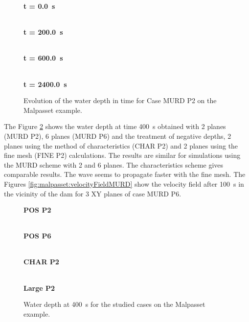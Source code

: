 \begin{figure}[H]
  \centering
  \textbf{t = 0.0~s}\par\medskip
  \\
  \textbf{t = 200.0~s}\par\medskip
  \\
  \textbf{t = 600.0~s}\par\medskip
  \\
  \textbf{t = 2400.0~s}\par\medskip
  \caption{Evolution of the water depth in time for Case MURD P2 on the Malpasset example.}\label{fig:malpasset:WD_MURD_P2}
\end{figure}
The Figure \ref{fig:malpasset:WD_all} shows the water depth at time 400~s obtained with 2
planes (MURD P2), 6 planes (MURD P6) and the treatment of negative depths,
2 planes using the method of characteristics (CHAR P2) and 2 planes using the fine mesh
(FINE P2) calculations. The results are similar for simulations using the MURD scheme with 2 and
6 planes. The characteristics scheme gives comparable results.
The wave seems to propagate faster with the fine mesh.
The Figures \ref{fig:malpasset:velocityFieldMURD} show the velocity field after 100~s in the vicinity of the dam for 3 XY planes of case MURD P6.
\begin{figure}[H]
  \centering
  \textbf{POS P2}\par\medskip
  \\
  \textbf{POS P6}\par\medskip
  \\
  \textbf{CHAR P2}\par\medskip
  \\
  \textbf{Large P2}\par\medskip
  \caption{Water depth at 400~s for the studied cases on the Malpasset example.}\label{fig:malpasset:WD_all}
\end{figure}



